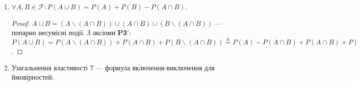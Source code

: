 \begin{enumerate}
    \begin{proof}
        Наслідок з доведення властивості 4.
    \end{proof}
    \item $\forall A, B \in \mathcal{F}: P(A \cup B) = P(A) + P(B) - P(A \cap B)$.
    \begin{proof}
        $A \cup B = (A\backslash(A \cap B)) 
        \cup (A \cap B) 
        \cup (B\backslash(A \cap B))$ --- попарно несумісні події. 
        \newline
        З аксіоми \textbf{P3$'$}: $P(A \cup B) = P(A\backslash(A \cap B)) 
        + P(A \cap B) + P(B\backslash(A \cap B)) \overset{6}{=} P(A) - P(A \cap B) + P(A \cap B)
        + P(B) - P(A \cap B) = P(A) + P(B) - P(A \cap B)$.
    \end{proof}
    \item Узагальнення властивості 7 --- формула включення-виключення для ймовірностей: 
    

\end{enumerate}
